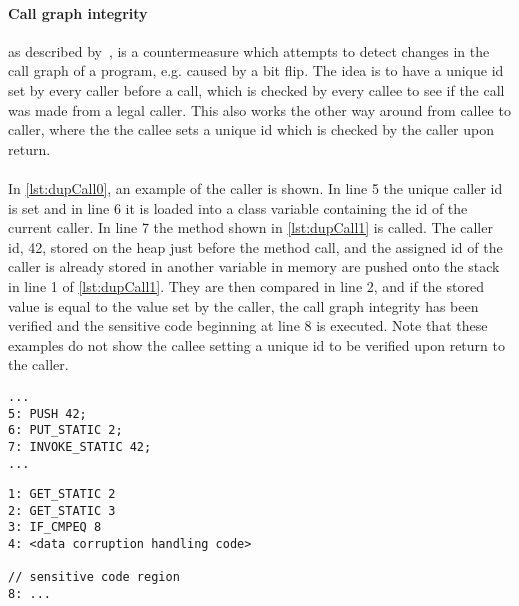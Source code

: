 \paragraph{Call graph integrity} as described by~\cite[p. 12]{javasec}, is a countermeasure which attempts to detect changes in the call graph of a program, e.g. caused by a bit flip. The idea is to have a unique id set by every caller before a call, which is checked by every callee to see if the call was made from a legal caller. This also works the other way around from callee to caller, where the the callee sets a unique id which is checked by the caller upon return.\\\\
In \cref{lst:dupCall0}, an example of the caller is shown. In line 5 the unique caller id is set and in line 6 it is loaded into a class variable containing the id of the current caller. In line 7 the method shown in \cref{lst:dupCall1} is called. The caller id, 42, stored on the heap just before the method call, and the assigned id of the caller is already stored in another variable in memory are pushed onto the stack in line 1 of \ref{lst:dupCall1}. They are then compared in line 2, and if the stored value is equal to the value set by the caller, the call graph integrity has been verified and the sensitive code beginning at line 8 is executed. Note that these examples do not show the callee setting a unique id to be verified upon return to the caller.

\begin{minipage}{\linewidth}
\begin{lstlisting}[caption={Caller with call graph integrity implemented. The code is written in \jcl. Note that for simplicity, the numbers in the left side are line numbers and do not denote the program counter values.}, label={lst:dupCall0}]
...
5: PUSH 42; 
6: PUT_STATIC 2;
7: INVOKE_STATIC 42;
...
\end{lstlisting}
\end{minipage}

\begin{minipage}{\linewidth}
\begin{lstlisting}[caption={Callee with call graph integrity implemented. The code is written in \jcl. Note that for simplicity, the numbers in the left side are line numbers and do not denote the program counter values.}, label={lst:dupCall0}]
1: GET_STATIC 2
2: GET_STATIC 3
3: IF_CMPEQ 8
4: <data corruption handling code>

// sensitive code region
8: ...
\end{lstlisting}
\end{minipage}